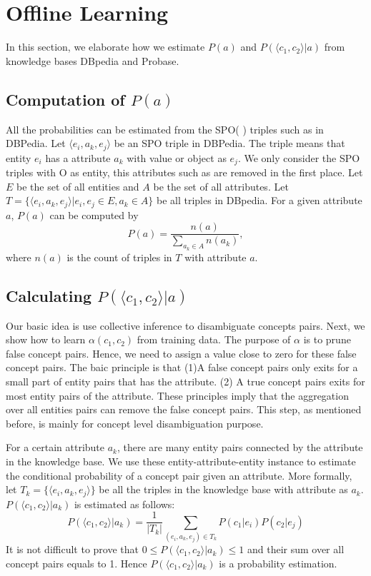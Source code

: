 \section{Offline Learning}
In this section, we elaborate how we estimate $P(a)$ and $P( \langle c_{1},c_{2} \rangle |a)$ from knowledge bases DBpedia and Probase.

\subsection{Computation of $P(a)$}
All the probabilities can be estimated from the SPO( ) triples such as   in DBPedia.
Let $ \langle e_i, a_k, e_j \rangle $ be an SPO triple in DBPedia.
The triple means that entity $e_i$ has a attribute $a_k$ with value or object as $e_j$.
We only consider the SPO triples with O as entity, this attributes such as  are removed in the first place.
Let $E$ be the set of all entities and $A$ be the set of all attributes.
Let $T=\{ \langle e_i, a_k, e_j \rangle  | e_i,e_j\in E, a_k\in A\}$ be all triples in DBpedia.
For a given attribute $a$, $P(a)$ can be computed by
\begin{equation}
\label{eq:pa}
P(a)=\frac{n(a)}{\sum_{a_k\in A}{n(a_k)}},
\end{equation}
where $n(a)$ is the count of triples in $T$ with attribute $a$.


\subsection{Calculating $P( \langle c_{1},c_{2} \rangle |a)$ }

Our basic idea is use collective inference to disambiguate concepts pairs.
Next, we show how to learn $\alpha(c_1,c_2)$ from training data.
The purpose of $\alpha$ is to prune false concept pairs. Hence, we need to
assign a value close to zero for these false concept pairs.
The baic principle is that
(1)A false concept pairs only exits for a small part of
entity pairs that has the attribute.
(2) A true concept pairs exits for most entity pairs of the attribute.
These principles imply that the aggregation over all entities pairs can remove the false concept pairs.
This step, as mentioned before, is mainly for concept level disambiguation purpose.

For a certain attribute $a_k$, there are many entity pairs connected by the attribute in the knowledge base.
We use these entity-attribute-entity instance to estimate the conditional probability of a concept pair given an attribute.
More formally, let $T_k=\{\langle e_i, a_k, e_j \rangle\}$ be all the triples in the knowledge base with attribute as $a_k$.
$P( \langle c_1, c_2 \rangle |a_k)$ is estimated as follows:
\begin{equation}
P(\langle c_1, c_2\rangle|a_k)= \frac{1}{|T_k|}\sum_{  (e_{i},a_k,e_{j})\in T_k } P(c_1|e_{i})P(c_2|e_{j})
\label{eq:pccga}
\end{equation}
It is not difficult to prove that $0\leq P( \langle c_1, c_2 \rangle |a_k)\leq 1$ and their sum over all concept pairs equals to 1.
Hence $P( \langle c_1, c_2 \rangle |a_k)$ is a probability estimation.

